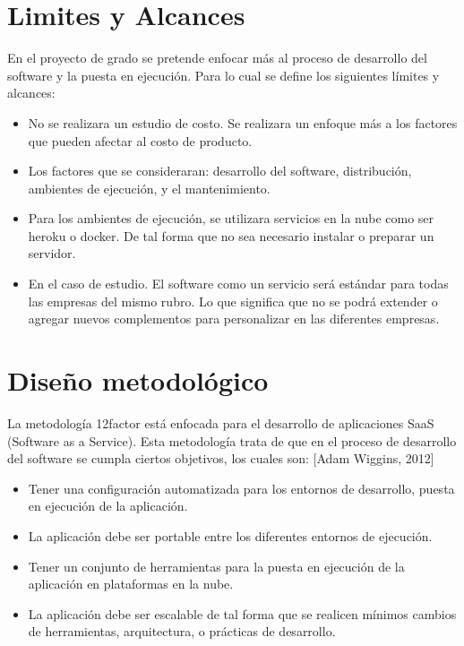 \section{Limites y Alcances}
\noindent En el proyecto de grado se pretende enfocar más al proceso de desarrollo del software y la puesta en ejecución. Para lo cual se define los siguientes límites y alcances:
\begin{itemize}
  \item No se realizara un estudio de costo. Se realizara un enfoque más a los factores que pueden afectar al costo de producto.
  \item Los factores que se consideraran: desarrollo del software, distribución, ambientes de ejecución, y el mantenimiento.
  \item Para los ambientes de ejecución, se utilizara servicios en la nube como ser heroku o docker. De tal forma que no sea necesario instalar o preparar un servidor.
  \item En el caso de estudio. El software como un servicio será estándar para todas las empresas del mismo rubro. Lo que significa que no se podrá extender o agregar nuevos complementos para personalizar en las diferentes empresas.
\end{itemize}

\section{Diseño metodológico}
\noindent La metodología 12factor está enfocada para el desarrollo de aplicaciones SaaS (Software as a Service). Esta metodología trata de que en el proceso de desarrollo del software se cumpla ciertos objetivos, los cuales son: [Adam Wiggins, 2012]

\begin{itemize}
  \item Tener una configuración automatizada para los entornos de desarrollo, puesta en ejecución de la aplicación.
  \item La aplicación debe ser portable entre los diferentes entornos de ejecución.
  \item Tener un conjunto de herramientas para la puesta en ejecución de la aplicación en plataformas en la nube.
  \item La aplicación debe ser escalable de tal forma que se realicen mínimos cambios de herramientas, arquitectura, o prácticas de desarrollo.
\end{itemize}

